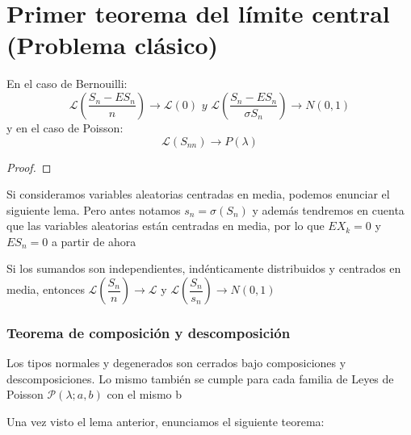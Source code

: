 \section{Primer teorema del límite central (Problema clásico)}
En el caso de Bernouilli:
$$\mathcal{L}\left( \frac{S_n-ES_n}{n}  \right)\rightarrow \mathcal{L}(0) \,\, y \,\, \mathcal{L}\left( \frac{S_n-ES_n}{\sigma S_n}  \right)\rightarrow N(0,1)$$
y en el caso de Poisson:
$$\mathcal{L}(S_{nn})\rightarrow P(\lambda)$$
\begin{proof}

\end{proof}
Si consideramos variables aleatorias centradas en media, podemos enunciar el siguiente lema. Pero antes notamos $s_n=\sigma(S_n)$ y además tendremos en cuenta que las variables aleatorias están centradas en media, por lo que $EX_k=0$ y $ES_n=0$ a partir de ahora
\begin{lemma}
Si los sumandos son independientes, indénticamente distribuidos y centrados en media, entonces $\mathcal{L} \left( \dfrac{S_n}{n} \right)\rightarrow \mathcal{L}$ y $\mathcal{L} \left( \dfrac{S_n}{s_n} \right)\rightarrow N(0,1)$
\end{lemma}
\subsubsection{Teorema de composición y descomposición}
\begin{theorem}
Los tipos normales y degenerados son cerrados bajo composiciones y descomposiciones. Lo mismo también se cumple para cada familia de Leyes de Poisson $\mathcal{P}(\lambda ; a,b)$ con el mismo b
\end{theorem}
Una vez visto el lema anterior, enunciamos el siguiente teorema:


